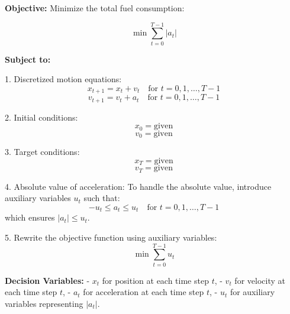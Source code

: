 \documentclass{article}
\begin{document}
\textbf{Objective:} Minimize the total fuel consumption:

\[
\min \sum_{t=0}^{T-1} |a_t|
\]

\textbf{Subject to:}

1. Discretized motion equations:
   \[
   x_{t+1} = x_t + v_t \quad \text{for } t = 0, 1, \ldots, T-1
   \]
   \[
   v_{t+1} = v_t + a_t \quad \text{for } t = 0, 1, \ldots, T-1
   \]

2. Initial conditions:
   \[
   x_0 = \text{given}
   \]
   \[
   v_0 = \text{given}
   \]

3. Target conditions:
   \[
   x_T = \text{given}
   \]
   \[
   v_T = \text{given}
   \]

4. Absolute value of acceleration:
   To handle the absolute value, introduce auxiliary variables \( u_t \) such that:
   \[
   -u_t \leq a_t \leq u_t \quad \text{for } t = 0, 1, \ldots, T-1
   \]
   which ensures \( |a_t| \leq u_t \).

5. Rewrite the objective function using auxiliary variables:
   \[
   \min \sum_{t=0}^{T-1} u_t
   \]

\textbf{Decision Variables:} 
- \( x_t \) for position at each time step \( t \),
- \( v_t \) for velocity at each time step \( t \),
- \( a_t \) for acceleration at each time step \( t \),
- \( u_t \) for auxiliary variables representing \( |a_t| \).
\end{document}
